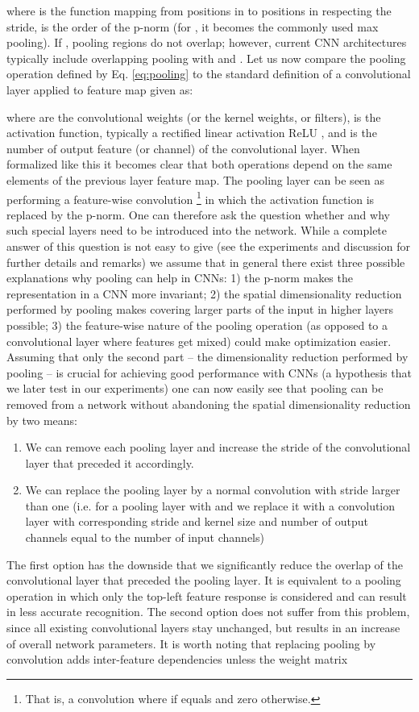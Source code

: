 \documentclass{article} \usepackage{iclr2015,times}
\begin{document}
 where  is the function mapping from
 positions in  to positions in  respecting the stride,  is
 the order of the p-norm (for , it becomes the commonly used max pooling). If
 , pooling regions do not overlap; however, current CNN architectures typically include overlapping pooling with  and .
 Let us now compare the pooling operation defined by
 Eq. \ref{eq:pooling} to the standard definition of a
 convolutional layer  applied to feature map  given as:
 
 where  are the convolutional weights (or the kernel weights, or filters),
  is the activation function, typically a rectified linear activation ReLU , and  is the number of output feature (or channel) of the
 convolutional layer. When
 formalized like this it becomes clear that both operations depend on the same elements of the 
 previous layer feature map. The pooling layer can be seen as performing a feature-wise convolution
\footnote{That is, a convolution where  if 
  equals  and zero otherwise.} 
in which the
 activation function is replaced by the p-norm. 
 One can therefore ask the question whether and why such special layers need to be introduced into the network.
 While a complete answer of this question is not easy to give (see the
 experiments and discussion for further details and remarks) we assume that in general there exist three possible explanations why
pooling can help in CNNs: 1) the p-norm makes the representation in a CNN more invariant; 2) the spatial dimensionality
reduction performed by pooling makes covering larger 
parts of the input in higher layers possible; 3) the feature-wise
nature of the pooling operation (as opposed to a convolutional layer where features get mixed) could make optimization easier.
Assuming that only the second part -- the dimensionality reduction
performed by pooling -- is crucial for achieving good performance with
CNNs (a hypothesis that we later test in our experiments) one can now
easily see that pooling can be removed from a network without
abandoning the spatial dimensionality reduction by two means:
\begin{enumerate}
  \item We can remove each pooling layer and increase the stride of the
convolutional layer that preceded it accordingly.
  \item We can replace the pooling layer by a normal convolution with
    stride larger than one (i.e. for a pooling layer with  and
     we replace it with a convolution layer with corresponding stride
    and kernel size and number of output channels equal to the number of input channels)
\end{enumerate}
The first option has the downside that we significantly reduce the
overlap of the convolutional layer that preceded the pooling layer. It
is equivalent to a pooling operation in which only the top-left
feature response is considered and can result in less accurate
recognition. The second option does not suffer from this problem,
since all existing convolutional layers stay unchanged, but results in
an increase of overall network parameters. It is worth noting that
replacing pooling by convolution adds inter-feature dependencies
unless the weight matrix 
\end{document}
